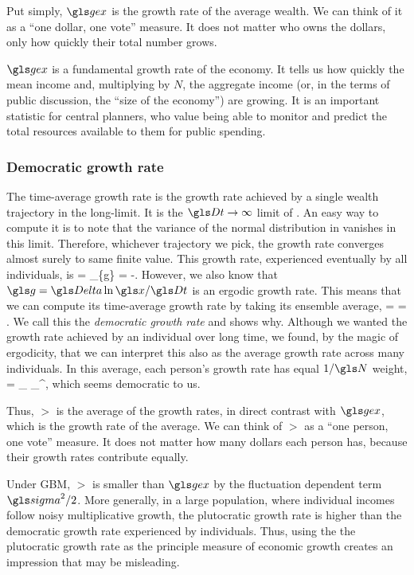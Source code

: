 Put simply, $\gex$ is the growth rate of the average wealth. We can think of it as a ``one dollar, one vote'' measure. It does not matter who owns the dollars, only how quickly their total number grows.

$\gex$ is a fundamental growth rate of the economy. It tells us how quickly the mean income and, multiplying by $N$, the aggregate income (or, in the terms of public discussion, the ``size of the economy'') are growing. It is an important statistic for central planners, who value being able to monitor and predict the total resources available to them for public spending.

\subsubsection{Democratic growth rate}
The time-average growth rate is the growth rate achieved by a single wealth trajectory in the long-limit. It is the $\Dt\to\infty$ limit of . An easy way to compute it is to note that the variance of the normal distribution in  vanishes in this limit. Therefore, whichever trajectory we pick, the growth rate converges almost surely to same finite value. This growth rate, experienced eventually by all individuals, is
\be
\gt = \lim_{\Dt\to\infty}\left\{g\right\} = \gmu-.
\ee
However, we also know that $\g=\D\ln\x/\Dt$ is an ergodic growth rate. This means that we can compute its time-average growth rate by taking its ensemble average, 
\be
\gt = \ave{\g} = \ave{\frac{\D\ln \x}{\Dt}}.
\ee
We call this the \textit{democratic growth rate} and  shows why. Although we wanted the growth rate achieved by an individual over long time, we found, by the magic of  ergodicity, that we can interpret this also as the average growth rate across many individuals. In this average, each person's growth rate has equal $1/\N$ weight,
\be
\gt = \lim_{\N\to\infty} \sum_{}^\N \frac{\g_\gi}{\N},
\ee
which seems democratic to us.

Thus, $\gt$ is the average of the growth rates, in direct contrast with $\gex$, which is the growth rate of the average. We can think of $\gt$ as a ``one person, one vote'' measure. It does not matter how many dollars each person has, because their growth rates contribute equally.

Under GBM, $\gt$ is smaller than $\gex$ by the fluctuation dependent term $\gsigma^2/2$. More generally, in a large population, where individual incomes follow noisy multiplicative growth, the plutocratic growth rate is higher than the democratic growth rate experienced by individuals. Thus, using the the plutocratic growth rate as the principle measure of economic growth creates an impression that may be misleading.

